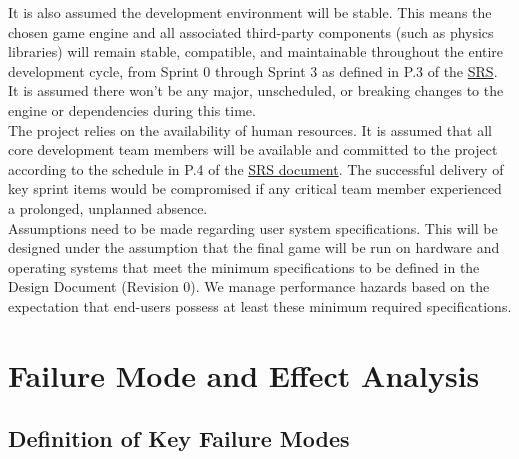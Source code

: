 \documentclass{article}
\begin{document}
It is also assumed the development environment will be stable. This means the chosen game engine and all associated third-party components (such as physics libraries) will remain stable, compatible, and maintainable throughout the entire development cycle, from Sprint 0 through Sprint 3 as defined in P.3 of the \href{https://github.com/felix-hurst/Ad-Natura/blob/main/docs/SRS/SRS.pdf}{SRS}. It is assumed there won't be any major, unscheduled, or breaking changes to the engine or dependencies during this time.\\

The project relies on the availability of human resources. It is assumed that all core development team members will be available and committed to the project according to the schedule in P.4 of the \href{https://github.com/felix-hurst/Ad-Natura/blob/main/docs/SRS/SRS.pdf}{SRS document}. The successful delivery of key sprint items would be compromised if any critical team member experienced a prolonged, unplanned absence.\\

Assumptions need to be made regarding user system specifications. This will be designed under the assumption that the final game will be run on hardware and operating systems that meet the minimum specifications to be defined in the Design Document (Revision 0). We manage performance hazards based on the expectation that end-users possess at least these minimum required specifications.\\

\section{Failure Mode and Effect Analysis}

\subsection{Definition of Key Failure Modes}
\end{document}
